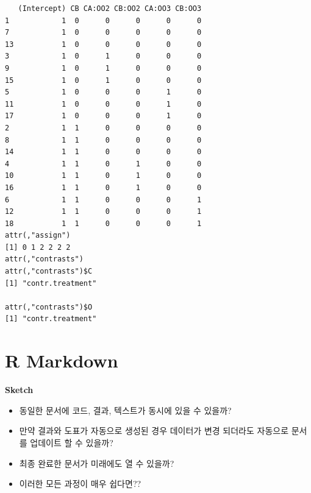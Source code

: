 \documentclass[
  11pt,
]{krantz}
\makeatletter
\providecommand{\tightlist}{%
  \setlength{\itemsep}{0pt}\setlength{\parskip}{0pt}}
\newenvironment{kframe}{%
\medskip{}
\setlength{\fboxsep}{.8em}
 \def\at@end@of@kframe{}%
 \ifinner\ifhmode%
  \def\at@end@of@kframe{\end{minipage}}%
  \begin{minipage}{\columnwidth}%
 \fi\fi%
 \def\FrameCommand##1{\hskip\@totalleftmargin \hskip-\fboxsep
 \colorbox{shadecolor}{##1}\hskip-\fboxsep
     \hskip-\linewidth \hskip-\@totalleftmargin \hskip\columnwidth}%
 \MakeFramed {\advance\hsize-\width
   \@totalleftmargin\z@ \linewidth\hsize
   \@setminipage}}%
 {\par\unskip\endMakeFramed%
 \at@end@of@kframe}
\renewenvironment{quote}{\begin{kframe}}{\end{kframe}}
\makeatother
\begin{document}
\begin{verbatim}
   (Intercept) CB CA:OO2 CB:OO2 CA:OO3 CB:OO3
1            1  0      0      0      0      0
7            1  0      0      0      0      0
13           1  0      0      0      0      0
3            1  0      1      0      0      0
9            1  0      1      0      0      0
15           1  0      1      0      0      0
5            1  0      0      0      1      0
11           1  0      0      0      1      0
17           1  0      0      0      1      0
2            1  1      0      0      0      0
8            1  1      0      0      0      0
14           1  1      0      0      0      0
4            1  1      0      1      0      0
10           1  1      0      1      0      0
16           1  1      0      1      0      0
6            1  1      0      0      0      1
12           1  1      0      0      0      1
18           1  1      0      0      0      1
attr(,"assign")
[1] 0 1 2 2 2 2
attr(,"contrasts")
attr(,"contrasts")$C
[1] "contr.treatment"

attr(,"contrasts")$O
[1] "contr.treatment"
\end{verbatim}

\normalsize

\hypertarget{r-markdown}{%
\chapter{R Markdown}\label{r-markdown}}

\begin{quote}
\textbf{Sketch}

\begin{itemize}
\tightlist
\item
  동일한 문서에 코드, 결과, 텍스트가 동시에 있을 수 있을까?
\item
  만약 결과와 도표가 자동으로 생성된 경우 데이터가 변경 되더라도 자동으로 문서를 업데이트 할 수 있을까?
\item
  최종 완료한 문서가 미래에도 열 수 있을까?
\item
  이러한 모든 과정이 매우 쉽다면??
\end{itemize}
\end{quote}

\footnotesize
\end{document}
